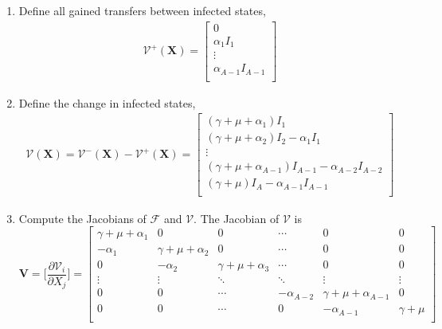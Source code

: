 \documentclass[12pt]{article}
\begin{document}
\begin{enumerate}
    \item Define all gained transfers between infected states, 
    \begin{align*}
        \mathcal{V}^+(\mathbf{X}) = \begin{bmatrix}
        0 \\
        \alpha_1 I_1 \\
        \vdots \\
        \alpha_{A-1} I_{A-1} \\
        \end{bmatrix}
    \end{align*}
    \item Define the change in infected states,
    \begin{align*}
        \mathcal{V}(\mathbf{X}) = \mathcal{V}^-(\mathbf{X}) - \mathcal{V}^+(\mathbf{X}) = \begin{bmatrix}
        (\gamma + \mu + \alpha_1) I_1 \\
        (\gamma + \mu + \alpha_2) I_2 - \alpha_1 I_1 \\
        \vdots \\
        (\gamma + \mu + \alpha_{A-1}) I_{A-1} - \alpha_{A-2} I_{A-2} \\
        (\gamma + \mu) I_A - \alpha_{A-1} I_{A-1} \\
        \end{bmatrix}
    \end{align*}
    \item Compute the Jacobians of $\mathcal{F}$ and $\mathcal{V}$. The Jacobian of $\mathcal{V}$ is
    $$
    \mathbf{V} = \Big[\frac{\partial \mathcal{V}_i}{\partial X_j}\Big] =  \begin{bmatrix}
     \gamma + \mu + \alpha_1 & 0 & 0 & \cdots & 0 & 0\\
     -\alpha_1 & \gamma + \mu + \alpha_2 & 0 & \cdots & 0 & 0\\
     0 & -\alpha_2 & \gamma + \mu + \alpha_3 & \cdots & 0 & 0\\
    \vdots & \vdots & \ddots & \ddots & \vdots & \vdots \\
    0 & 0 & \cdots & -\alpha_{A-2} & \gamma + \mu + \alpha_{A-1} & 0 \\
    0 & 0 & \cdots & 0 & -\alpha_{A-1} & \gamma + \mu \\
    \end{bmatrix}
    $$
      

\end{enumerate}
\end{document}

